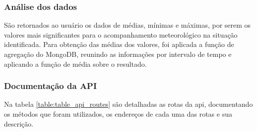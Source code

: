 \subsubsection{Análise dos dados}

São retornados ao usuário os dados de médias, mínimas e máximas, por serem os valores mais significantes para o acompanhamento meteorológico na situação identificada.
Para obtenção das médias dos valores, foi aplicada a função de agregação do MongoDB, reunindo as informações por intervalo de tempo e aplicando a função de média sobre o resultado.

\subsubsection{Documentação da API}
\label{sec:doc_api}

Na tabela \ref{table:table_api_routes} são detalhadas as rotas da api, documentando os métodos que foram utilizados, os endereços de cada uma das rotas e sua descrição.


